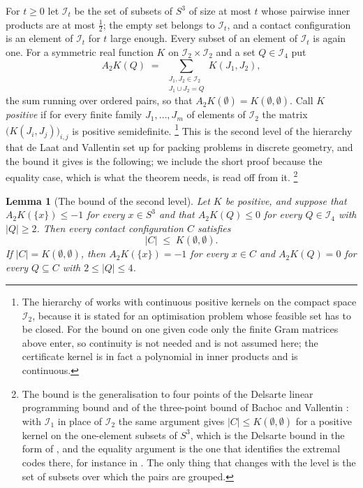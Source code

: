 \documentclass[11pt,reqno]{amsart}
\renewcommand{\_}{\origunderscore\allowbreak}
\numberwithin{equation}{section}
\theoremstyle{plain}
\newtheorem{lem}[thm]{Lemma}
\theoremstyle{definition}
\theoremstyle{remark}
\begin{document}
For $t\ge0$ let $\mathcal I_t$ be the set of subsets of $S^3$ of size at
most $t$ whose pairwise inner products are at most $\tfrac12$; the empty
set belongs to $\mathcal I_t$, and a contact configuration is an element
of $\mathcal I_t$ for $t$ large enough. Every subset of an element of
$\mathcal I_t$ is again one. For a symmetric real function $K$ on
$\mathcal I_2\times\mathcal I_2$ and a set $Q\in\mathcal I_4$ put
\begin{equation}\label{eq:A2}
  A_2K(Q)\;=\;\sum_{\substack{J_1,J_2\in\mathcal I_2\\ J_1\cup J_2=Q}}K(J_1,J_2),
\end{equation}
the sum running over ordered pairs, so that $A_2K(\emptyset)=K(\emptyset,\emptyset)$.
Call $K$ \emph{positive} if for every finite family $J_1,\dots,J_m$ of
elements of $\mathcal I_2$ the matrix $\bigl(K(J_i,J_j)\bigr)_{i,j}$ is
positive semidefinite.%
\footnote{The hierarchy of \cite{dLV15} works with continuous positive
  kernels on the compact space $\mathcal I_2$, because it is stated for
  an optimisation problem whose feasible set has to be closed. For the
  bound on one given code only the finite Gram matrices above enter, so
  continuity is not needed and is not assumed here; the certificate
  kernel is in fact a polynomial in inner products and is continuous.}
This is the second level of the hierarchy that de
Laat and Vallentin \cite{dLV15} set up for packing problems in discrete
geometry, and the bound it gives is the following; we include the short
proof because the equality case, which is what the theorem needs, is
read off from it.%
\footnote{The bound is the generalisation to four points of the
  Delsarte linear programming bound and of the three-point bound of
  Bachoc and Vallentin \cite{BV08}: with $\mathcal I_1$ in place of
  $\mathcal I_2$ the same argument gives $|C|\le K(\emptyset,\emptyset)$
  for a positive kernel on the one-element subsets of $S^3$, which is
  the Delsarte bound in the form of \cite{DGS77}, and the equality
  argument is the one that identifies the extremal codes there, for
  instance in \cite{CK07}. The only thing that changes with the level
  is the set of subsets over which the pairs are grouped.}

\begin{lem}[The bound of the second level]\label{lem:las2}
Let $K$ be positive, and suppose that $A_2K(\{x\})\le-1$ for every
$x\in S^3$ and that $A_2K(Q)\le0$ for every $Q\in\mathcal I_4$ with
$|Q|\ge2$. Then every contact configuration $C$ satisfies
\[
  |C|\;\le\;K(\emptyset,\emptyset).
\]
If $|C|=K(\emptyset,\emptyset)$, then $A_2K(\{x\})=-1$ for every $x\in C$
and $A_2K(Q)=0$ for every $Q\subseteq C$ with $2\le|Q|\le4$.
\end{lem}
\end{document}
